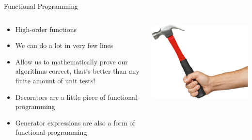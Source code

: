 \documentclass{lug}
\begin{document}
\begin{frame}{Functional Programming}
    \begin{columns}
        \begin{column}{0.7\linewidth}
            \begin{itemize}[<+->]
                \item High-order functions
                \item We can do a lot in very few lines
                \item Allow us to mathematically prove our algorithms correct, that's
                    better than any finite amount of unit tests!
                \item Decorators are a little piece of functional programming
                \item Generator expressions are also a form of functional
                    programming
            \end{itemize}
        \end{column}
        \begin{column}{0.3\linewidth}
            \hspace*{25pt}\includegraphics[width=\textwidth]{graphics/hammer.png}
        \end{column}
    \end{columns}
\end{frame}
\end{document}
